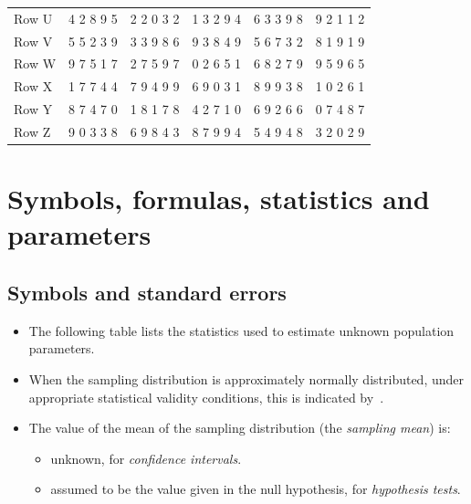 \documentclass[
  11pt,
  a4paper,
  krantz2]{krantz}
\providecommand{\tightlist}{%
  \setlength{\itemsep}{0pt}\setlength{\parskip}{0pt}}
\begin{document}
\begin{table}
\begin{tabular}[t]{llllll}
\addlinespace
Row U & 4 2 8 9 5 & 2 2 0 3 2 & 1 3 2 9 4 & 6 3 3 9 8 & 9 2 1 1 2\\
Row V & 5 5 2 3 9 & 3 3 9 8 6 & 9 3 8 4 9 & 5 6 7 3 2 & 8 1 9 1 9\\
Row W & 9 7 5 1 7 & 2 7 5 9 7 & 0 2 6 5 1 & 6 8 2 7 9 & 9 5 9 6 5\\
Row X & 1 7 7 4 4 & 7 9 4 9 9 & 6 9 0 3 1 & 8 9 9 3 8 & 1 0 2 6 1\\
Row Y & 8 7 4 7 0 & 1 8 1 7 8 & 4 2 7 1 0 & 6 9 2 6 6 & 0 7 4 8 7\\
\addlinespace
Row Z & 9 0 3 3 8 & 6 9 8 4 3 & 8 7 9 9 4 & 5 4 9 4 8 & 3 2 0 2 9\\
\bottomrule
\end{tabular}
\end{table}

\chapter{Symbols, formulas, statistics and parameters}\label{StatisticsAndParameters}

\section{Symbols and standard errors}\label{Symbols}

\begin{itemize}
\item
  The following table lists the statistics used to estimate unknown population parameters. \tightlist
\item
  When the sampling distribution is approximately normally distributed, under appropriate statistical validity conditions, this is indicated by~.
\item
  The value of the mean of the sampling distribution (the \emph{sampling mean}) is:

  \begin{itemize}
  \tightlist
  \item
    unknown, for \emph{confidence intervals}.
  \item
    assumed to be the value given in the null hypothesis, for \emph{hypothesis tests}.
  \end{itemize}
\end{itemize}
\end{document}
